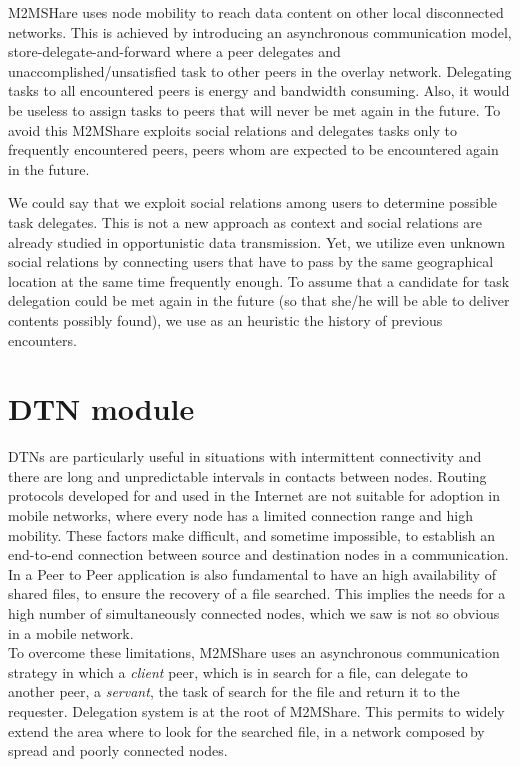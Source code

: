 M2MSHare uses node mobility to reach data content on other local disconnected networks. This is achieved by introducing an asynchronous communication model, store-delegate-and-forward where a peer delegates and unaccomplished/unsatisfied task to other peers in the overlay network. Delegating tasks to all encountered peers is energy and bandwidth consuming. Also, it would be useless to assign tasks to peers that will never be met again in the future. To avoid this M2MShare exploits social relations and delegates tasks only to frequently encountered peers, peers whom are expected to be encountered again in the future.

We could say that we exploit social relations among users to determine possible task delegates. This is not a new approach as context and social relations are already studied in opportunistic data transmission. Yet, we utilize even unknown social relations by connecting users that have to pass by the same geographical location at the same time frequently enough. To assume that a candidate for task delegation could be met again in the future (so that she/he will be able to deliver contents possibly found), we use as an heuristic the history of previous encounters.

\section{DTN module}
DTNs are particularly useful in situations with intermittent connectivity and there are long and unpredictable intervals in contacts between nodes. Routing protocols developed for and used in the Internet are not suitable for adoption in mobile networks, where every node has a limited connection range and high mobility. These factors make difficult, and sometime impossible, to establish an end-to-end connection between source and destination nodes in a communication.
\\

In a Peer to Peer application is also fundamental to have an high availability of shared files, to ensure the recovery of a file searched. This implies the needs for a high number of simultaneously connected nodes, which we saw is not so obvious in a mobile network.
\\

To overcome these limitations, M2MShare uses an asynchronous communication strategy in which a \textit{client} peer, which is in search for a file, can delegate to another peer, a \textit{servant}, the task of search for the file and return it to the requester. Delegation system is at the root of M2MShare. This permits to widely extend the area where to look for the searched file, in a network composed by spread and poorly connected nodes.
\\


